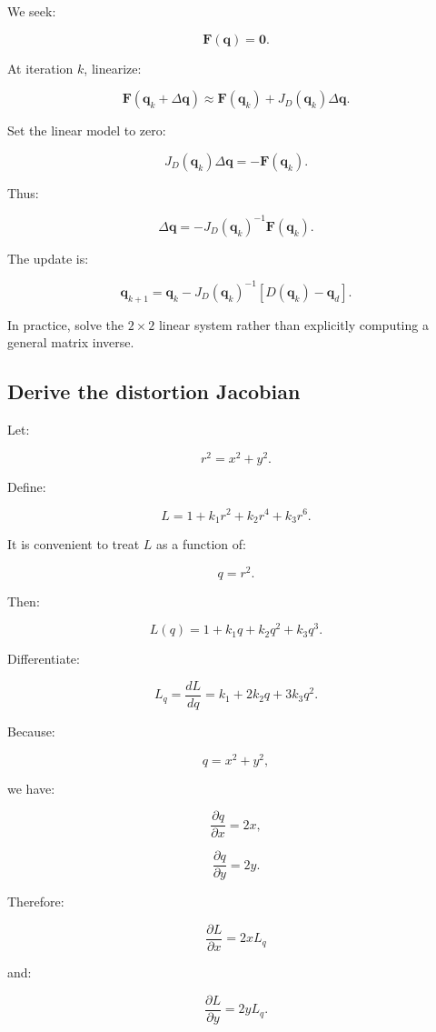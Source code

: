 We seek:

\[
 \mathbf F(\mathbf q)=\mathbf0.
\]

At iteration \(k\), linearize:

\[
 \mathbf F(\mathbf q_k+\Delta\mathbf q) \approx \mathbf F(\mathbf q_k)+J_D(\mathbf q_k)\Delta\mathbf q.
\]

Set the linear model to zero:

\[
 J_D(\mathbf q_k)\Delta\mathbf q = -\mathbf F(\mathbf q_k).
\]

Thus:

\[
 \boxed{ \Delta\mathbf q = -J_D(\mathbf q_k)^{-1} \mathbf F(\mathbf q_k) }.
\]

The update is:

\[
 \boxed{ \mathbf q_{k+1} = \mathbf q_k- J_D(\mathbf q_k)^{-1} [D(\mathbf q_k)-\mathbf q_d] }.
\]

In practice, solve the \(2\times2\) linear system rather than explicitly computing a general matrix inverse.

\subsection{Derive the distortion Jacobian}\label{02-foundations-ii-ch035-derive-the-distortion-jacobian}

Let:

\[
 r^2=x^2+y^2.
\]

Define:

\[
 L=1+k_1r^2+k_2r^4+k_3r^6.
\]

It is convenient to treat \(L\) as a function of:

\[
 q=r^2.
\]

Then:

\[
 L(q)=1+k_1q+k_2q^2+k_3q^3.
\]

Differentiate:

\[
 \boxed{ L_q=\frac{dL}{dq} = k_1+2k_2q+3k_3q^2 }.
\]

Because:

\[
 q=x^2+y^2,
\]

we have:

\[
 \frac{\partial q}{\partial x}=2x,
\]

\[
 \frac{\partial q}{\partial y}=2y.
\]

Therefore:

\[
 \boxed{ \frac{\partial L}{\partial x}=2xL_q }
\]

and:

\[
 \boxed{ \frac{\partial L}{\partial y}=2yL_q }.
\]

